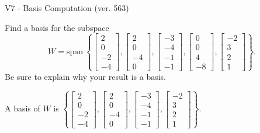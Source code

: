 \begin{exercise}
  \begin{exerciseTitle}V7 - Basis Computation (ver. 563)\end{exerciseTitle}
  \begin{exerciseStatement}
    Find a basis for the subspace 
\[W=\mathrm{span}\ \left\{\left[\begin{array}{r}
2 \\
0 \\
-2 \\
-4
\end{array}\right] , \left[\begin{array}{r}
2 \\
0 \\
-4 \\
0
\end{array}\right] , \left[\begin{array}{r}
-3 \\
-4 \\
-1 \\
-1
\end{array}\right] , \left[\begin{array}{r}
0 \\
0 \\
4 \\
-8
\end{array}\right] , \left[\begin{array}{r}
-2 \\
3 \\
2 \\
1
\end{array}\right]\right\}.\]
 Be sure to explain why your result is a basis.


  \end{exerciseStatement}
  \begin{exerciseAnswer}
   A basis of \(W\) is  \(\left\{\left[\begin{array}{r}
2 \\
0 \\
-2 \\
-4
\end{array}\right] , \left[\begin{array}{r}
2 \\
0 \\
-4 \\
0
\end{array}\right] , \left[\begin{array}{r}
-3 \\
-4 \\
-1 \\
-1
\end{array}\right] , \left[\begin{array}{r}
-2 \\
3 \\
2 \\
1
\end{array}\right]\right\}\).
  


  \end{exerciseAnswer}
\end{exercise}